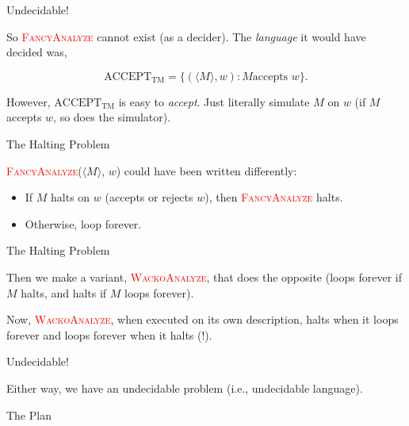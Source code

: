 \documentclass[12pt,compress]{beamer}
\newcommand{\func}[1]{\textcolor{red}{\textsc{#1}}}
\newcommand{\str}[1]{$\langle #1 \rangle$}
\begin{document}
\begin{frame}{Undecidable!}

  So \func{FancyAnalyze} cannot exist (as a decider). The \textit{language}
  it would have decided was,

  \begin{equation*}
    \text{ACCEPT}_{\text{TM}} = \{ (\langle M \rangle, w) : M \text{
      accepts } w\}.
  \end{equation*}

  \vskip 0.25in

  However, $\text{ACCEPT}_{\text{TM}}$ is easy to \textit{accept}. Just
  literally simulate $M$ on $w$ (if $M$ accepts $w$, so does the
  simulator).

\end{frame}

\begin{frame}{The Halting Problem}

  \func{FancyAnalyze}(\str{M}, $w$) could have been written differently:

  \begin{itemize}

  \item If $M$ halts on $w$ (accepts or rejects $w$), then \func{FancyAnalyze} halts.

  \item Otherwise, loop forever.

  \end{itemize}

\end{frame}

\begin{frame}{The Halting Problem}

  Then we make a variant, \func{WackoAnalyze}, that does the opposite
  (loops forever if $M$ halts, and halts if $M$ loops forever).

  \vskip 0.25in

  Now, \func{WackoAnalyze}, when executed on its own description,
  halts when it loops forever and loops forever when it halts (!).

\end{frame}

\begin{frame}{Undecidable!}

  Either way, we have an undecidable problem (i.e., undecidable
  language).

\end{frame}

\begin{frame}{The Plan}

  

\end{frame}
\end{document}
